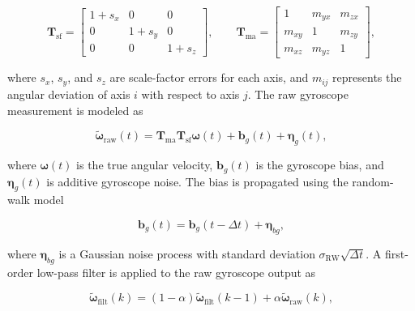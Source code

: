 \begin{equation}
    \mathbf{T}_{\mathrm{sf}}
    =
    \begin{bmatrix}
        1+s_x & 0 & 0 \\
        0 & 1+s_y & 0 \\
        0 & 0 & 1+s_z
    \end{bmatrix},
    \qquad
    \mathbf{T}_{\mathrm{ma}}
    =
    \begin{bmatrix}
        1 & m_{yx} & m_{zx} \\
        m_{xy} & 1 & m_{zy} \\
        m_{xz} & m_{yz} & 1
    \end{bmatrix},
    \label{eq:app_adcs_scale_misalignment_matrices}
\end{equation}

where \(s_x\), \(s_y\), and \(s_z\) are scale-factor errors for each axis, and \(m_{ij}\) represents the angular deviation of axis \(i\) with respect to axis \(j\). The raw gyroscope measurement is modeled as

\begin{equation}
    \tilde{\boldsymbol{\omega}}_{\mathrm{raw}}(t)
    =
    \mathbf{T}_{\mathrm{ma}}
    \mathbf{T}_{\mathrm{sf}}
    \boldsymbol{\omega}(t)
    +
    \mathbf{b}_{g}(t)
    +
    \boldsymbol{\eta}_{g}(t),
    \label{eq:app_adcs_gyro_raw_measurement}
\end{equation}

where \(\boldsymbol{\omega}(t)\) is the true angular velocity, \(\mathbf{b}_{g}(t)\) is the gyroscope bias, and \(\boldsymbol{\eta}_{g}(t)\) is additive gyroscope noise. The bias is propagated using the random-walk model

\begin{equation}
    \mathbf{b}_{g}(t)
    =
    \mathbf{b}_{g}(t-\Delta t)
    +
    \boldsymbol{\eta}_{bg},
    \label{eq:app_adcs_gyro_bias_random_walk}
\end{equation}

where \(\boldsymbol{\eta}_{bg}\) is a Gaussian noise process with standard deviation \(\sigma_{\mathrm{RW}}\sqrt{\Delta t}\). A first-order low-pass filter is applied to the raw gyroscope output as

\begin{equation}
    \tilde{\boldsymbol{\omega}}_{\mathrm{filt}}(k)
    =
    (1-\alpha)
    \tilde{\boldsymbol{\omega}}_{\mathrm{filt}}(k-1)
    +
    \alpha
    \tilde{\boldsymbol{\omega}}_{\mathrm{raw}}(k),
    \label{eq:app_adcs_gyro_low_pass_filter}
\end{equation}

